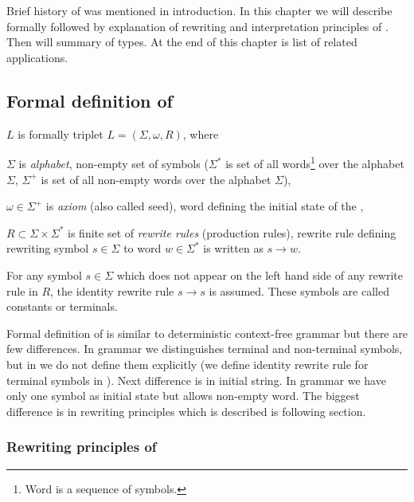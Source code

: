 
\chapter{\lsystem}

Brief history of \lsystem was mentioned in introduction.
In this chapter we will describe \lsystems formally followed by explanation of rewriting and interpretation principles of \lsystems.
Then will summary of \lsystem types.
At the end of this chapter is list of related applications.


\section{Formal definition of \lsystem}

\lsystem $L$ is formally triplet $L = (\Sigma, \omega, R)$, where

\begin{itemize*}
	\item $\Sigma$ is \emph{alphabet}, non-empty set of symbols ($\Sigma^{*}$ is set of all words\footnote{Word is a sequence of symbols.} over the alphabet $\Sigma$, $\Sigma^{+}$ is set of all non-empty words over the alphabet $\Sigma$),
	\item $\omega \in \Sigma^{+}$ is \emph{axiom} (also called seed), word defining the initial state of the \lsystem,
	\item $R \subset \Sigma \times \Sigma^{*}$ is finite set of \emph{rewrite rules} (production rules), rewrite rule defining rewriting symbol $s \in \Sigma$ to word $w \in \Sigma^{*}$ is written as $s \rightarrow w$.
\end{itemize*}

For any symbol $s \in \Sigma$ which does not appear on the left hand side of any rewrite rule in $R$, the identity rewrite rule $s \rightarrow s$ is assumed.
These symbols are called constants or terminals.

Formal definition of \lsystem is similar to deterministic context-free grammar but there are few differences.
In grammar we distinguishes terminal and non-terminal symbols, but in \lsystems we do not define them explicitly (we define identity rewrite rule for terminal symbols in \lsystems).
Next difference is in initial string.
In grammar we have only one symbol as initial state but \lsystem allows non-empty word.
The biggest difference is in rewriting principles which is described is following section.


\subsection{Rewriting principles of \lsystem}

